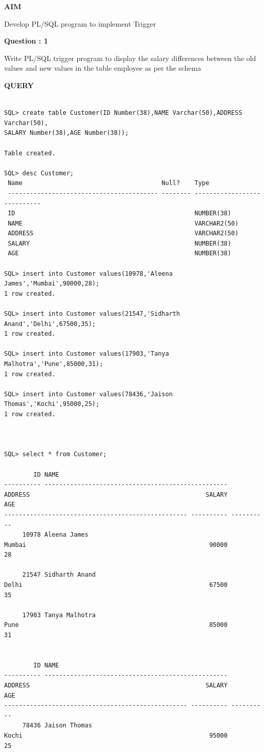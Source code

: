 \documentclass[a4paper,12pt]{report}
\begin{document}
\begin{flushleft}
\textbf{AIM }
\end{flushleft}
Develop PL/SQL program to implement Trigger

\begin{flushleft}
    \textbf{Question : 1}
\end{flushleft}
Write PL/SQL trigger program to display the salary differences between the old values and new values in the table employee as per the schema

\begin{flushleft}
\textbf{QUERY }
\end{flushleft}
 \begin{verbatim}

SQL> create table Customer(ID Number(38),NAME Varchar(50),ADDRESS Varchar(50),
SALARY Number(38),AGE Number(38));

Table created.

SQL> desc Customer;
 Name                                      Null?    Type
 ----------------------------------------- -------- ----------------------------
 ID                                                 NUMBER(38)
 NAME                                               VARCHAR2(50)
 ADDRESS                                            VARCHAR2(50)
 SALARY                                             NUMBER(38)
 AGE                                                NUMBER(38)

SQL> insert into Customer values(10978,'Aleena James','Mumbai',90000,28);
1 row created.

SQL> insert into Customer values(21547,'Sidharth Anand','Delhi',67500,35);
1 row created.

SQL> insert into Customer values(17903,'Tanya Malhotra','Pune',85000,31);
1 row created.

SQL> insert into Customer values(78436,'Jaison Thomas','Kochi',95000,25);
1 row created.



SQL> select * from Customer;

        ID NAME
---------- --------------------------------------------------
ADDRESS                                                SALARY        AGE
-------------------------------------------------- ---------- ----------
     10978 Aleena James
Mumbai                                                  90000         28

     21547 Sidharth Anand
Delhi                                                   67500         35

     17903 Tanya Malhotra
Pune                                                    85000         31


        ID NAME
---------- --------------------------------------------------
ADDRESS                                                SALARY        AGE
-------------------------------------------------- ---------- ----------
     78436 Jaison Thomas
Kochi                                                   95000         25

\end{verbatim}
\end{document}
